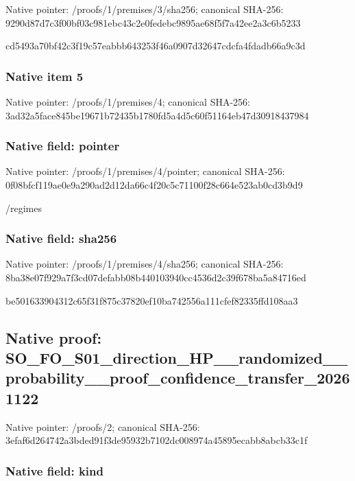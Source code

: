 \documentclass[10pt,a4paper]{article}
\begin{document}
Native pointer: /proofs/1/premises/3/sha256; canonical SHA-256: 9290d87d7c3f00bf03c981eb\allowbreak{}c43c2e0fedebc9895ae68f5f\allowbreak{}7a42ee2a3c6b5233


cd5493a70bf42c3f19c57eab\allowbreak{}bb643253f46a0907d32647cd\allowbreak{}cfa4fdadb66a9c3d


\subsubsection{Native item 5}


Native pointer: /proofs/1/premises/4; canonical SHA-256: 3ad32a5face845be19671b72\allowbreak{}435b1780fd5a4d5c60f51164\allowbreak{}eb47d30918437984



\subsubsection{Native field: pointer}


Native pointer: /proofs/1/premises/4/pointer; canonical SHA-256: 0f08bfcf119ae0e9a290ad2d\allowbreak{}12da66c4f20c5c71100f28c6\allowbreak{}64e523ab0cd3b9d9


/regimes


\subsubsection{Native field: sha256}


Native pointer: /proofs/1/premises/4/sha256; canonical SHA-256: 8ba38e07f929a7f3cd07defa\allowbreak{}bb08b440103940cc4536d2c3\allowbreak{}9f678ba5a84716ed


be501633904312c65f31f875\allowbreak{}c37820ef10ba742556a111cf\allowbreak{}ef82335ffd108aa3


\subsection{Native proof: SO\_FO\_S01\_direction\_HP\_\_\allowbreak{}randomized\_\_probability\_\allowbreak{}\_proof\_confidence\_transf\allowbreak{}er\_20261122}


Native pointer: /proofs/2; canonical SHA-256: 3efaf6d264742a3bded91f3d\allowbreak{}e95932b7102dc008974a4589\allowbreak{}5ecabb8abcb33c1f



\subsubsection{Native field: kind}
\end{document}
